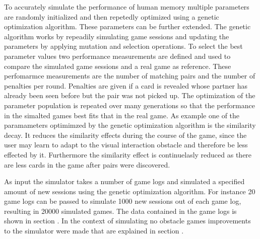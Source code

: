 To accurately simulate the performance of human memory multiple parameters are randomly initialized and then repetedly optimized using a genetic optimization algorithm. These parameters can be further extended. The genetic algorithm works by repeadily simulating game sessions and updating the parameters by applying mutation and selection operations. To select the best parameter values two performance measurements are defined and used to compare the simulated game sessions and a real game as reference. These perfomarmce measurements are the number of matching pairs and the number of penalties per round. Penalties are given if a card is revealed whose partner has already been seen before but the pair was not picked up. The optimization of the parameter population is repeated over many generations so that the performance in the simalted games best fits that in the real game. As example one of the paramameters optimimzed by the genetic optimization algorithm is the similarity decay. It reduces the similarity effects during the course of the game, since the user may learn to adapt to the visual interaction obstacle and therefore be less effected by it. Furthermore the similarity effect is continuelasly reduced as there are less cards in the game after pairs were discovered. 

As input the simulator takes a number of game logs and simulated a specified amount of new sessions using the genetic optimization algorithm. For instance 20 game logs can be passed to simulate 1000 new sessions out of each game log, resulting in 20000 simulated games. The data contained in the game logs is shown in section . In the context of simulating no obstacle games improvements to the simulator were made that are explained in section . 

